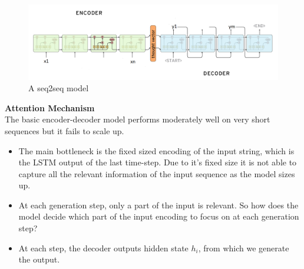 \documentclass{article} %
\begin{document}
\begin{figure}[th!]
    \includegraphics[width=1.0\columnwidth]{seq2seq2.png}
    \caption{A seq2seq model}
\end{figure}

\textbf{Attention Mechanism}\\
  The basic encoder-decoder model performs moderately well on very short sequences but it fails to scale up. 
    \begin{itemize}
      \item  The main bottleneck is the fixed sized encoding of the input string, which is the LSTM output of the last time-step. Due to it's fixed size it is not able to capture all the relevant information of the input sequence as the model sizes up. 
      \item At each generation step, only a part of the input is relevant. So how does the model decide which part of the input encoding to focus on at each generation step?
      \item At each step, the decoder outputs hidden state $h_i$, from which we generate the output.
    \end{itemize}
 
\end{document}
